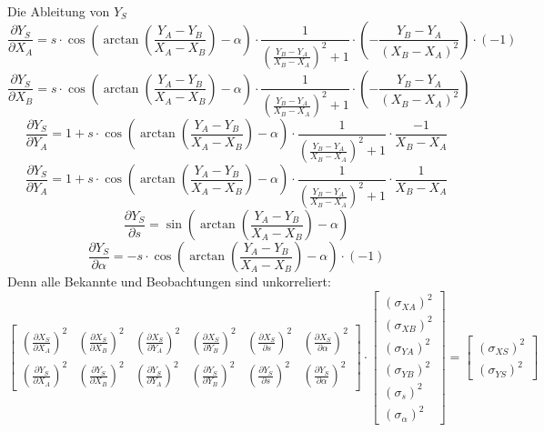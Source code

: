 \documentclass[12pt]{article}
\begin{document}
\newline
Die Ableitung von $Y_S$
\newline
\begin{equation}
\frac{\partial Y_S}{\partial X_A} = s \cdot \cos (\arctan(\frac{Y_A - Y_B}{X_A - X_B}) - \alpha) \cdot \frac{1}{(\frac{Y_B - Y_A}{X_B - X_A})^2 + 1} \cdot (- \frac{Y_B - Y_A}{(X_B - X_A)^2}) \cdot (-1)
\end{equation}
\begin{equation}
\frac{\partial Y_S}{\partial X_B} = s \cdot \cos (\arctan(\frac{Y_A - Y_B}{X_A - X_B}) - \alpha) \cdot \frac{1}{(\frac{Y_B - Y_A}{X_B - X_A})^2 + 1} \cdot (- \frac{Y_B - Y_A}{(X_B - X_A)^2})
\end{equation}
\begin{equation}
\frac{\partial Y_S}{\partial Y_A} = 1 + s \cdot \cos (\arctan(\frac{Y_A - Y_B}{X_A - X_B}) - \alpha) \cdot \frac{1}{(\frac{Y_B - Y_A}{X_B - X_A})^2 + 1} \cdot \frac{-1}{X_B - X_A}
\end{equation}
\begin{equation}
\frac{\partial Y_S}{\partial Y_A} = 1 + s \cdot \cos (\arctan(\frac{Y_A - Y_B}{X_A - X_B}) - \alpha) \cdot \frac{1}{(\frac{Y_B - Y_A}{X_B - X_A})^2 + 1} \cdot \frac{1}{X_B - X_A}
\end{equation}
\begin{equation}
\frac{\partial Y_S}{\partial s} = \sin(\arctan(\frac{Y_A - Y_B}{X_A - X_B}) - \alpha)
\end{equation}
\begin{equation}
\frac{\partial Y_S}{\partial \alpha} = -s \cdot \cos(\arctan(\frac{Y_A - Y_B}{X_A - X_B}) - \alpha) \cdot (-1)
\end{equation} 
Denn alle Bekannte und Beobachtungen sind unkorreliert: 
\begin{equation*}
\begin{bmatrix}
(\frac{\partial X_S}{\partial X_A})^2 & (\frac{\partial X_S}{\partial X_B})^2 & (\frac{\partial X_S}{\partial Y_A})^2 & (\frac{\partial X_S}{\partial Y_B})^2 & (\frac{\partial X_S}{\partial s})^2   & (\frac{\partial X_S}{\partial \alpha})^2\\
(\frac{\partial Y_S}{\partial X_A})^2 & (\frac{\partial Y_S}{\partial X_B})^2 & (\frac{\partial Y_S}{\partial Y_A})^2 & (\frac{\partial Y_S}{\partial Y_B})^2 & (\frac{\partial Y_S}{\partial s})^2   & (\frac{\partial Y_S}{\partial \alpha})^2
\end{bmatrix} \cdot 
\begin{bmatrix}
(\sigma_{XA})^2 \\ (\sigma_{XB})^2 \\ (\sigma_{YA})^2 \\ (\sigma_{YB})^2 \\ (\sigma_s)^2 \\ (\sigma_{\alpha})^2 
\end{bmatrix} = 
\begin{bmatrix}
(\sigma_{XS})^2 \\ (\sigma_{YS})^2
\end{bmatrix}
\end{equation*}
\end{document}
